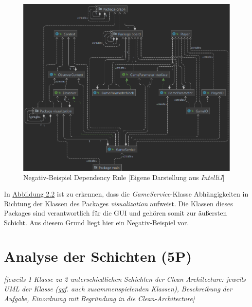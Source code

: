 \begin{figure}[htbp]
\centering
\centerline{\includegraphics[scale=.5]{dependencyrule_klasse_gameservice}}
\caption{Negativ-Beispiel Dependency Rule [Eigene Darstellung aus \emph{IntelliJ}]}
\label{fig:dependencyrulenegativ}
\end{figure}

\noindent In \hyperref[fig:dependencyrulepositiv]{Abbildung 2.2} ist zu erkennen, dass die \emph{GameService}-Klasse Abhängigkeiten in Richtung der Klassen des Packages \emph{visualization} aufweist. Die Klassen dieses Packages sind verantwortlich für die GUI und gehören somit zur äußersten Schicht. Aus diesem Grund liegt hier ein Negativ-Beispiel vor.

\newpage

\section{Analyse der Schichten (5P)}
\emph{[jeweils 1 Klasse zu 2 unterschiedlichen Schichten der Clean-Architecture: jeweils UML der Klasse
(ggf. auch zusammenspielenden Klassen), Beschreibung der Aufgabe, Einordnung mit Begründung in
die Clean-Architecture]}

